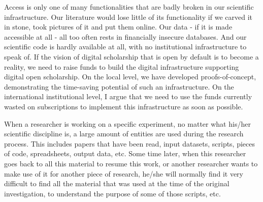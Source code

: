 \documentclass[a4paper,UKenglish]{dagrep}
\begin{document}
{}
\license
{}
Access is only one of many functionalities that are badly broken in our
scientific infrastructure. Our literature would lose little of its functionality
if we carved it in stone, took pictures of it and put them online. Our data - if
it is made accessible at all - all too often rests in financially insecure
databases. And our scientific code is hardly available at all, with no
institutional infrastructure to speak of. If the vision of digital scholarship
that is open by default is to become a reality, we need to raise funds to build
the digital infrastructure supporting digital open scholarship. On the local
level, we have developed proofs-of-concept, demonstrating the time-saving
potential of such an infrastructure. On the international institutional level, I
argue that we need to use the funds currently wasted on subscriptions to
implement this infrastructure as soon as possible.

  




{}
\license
When a researcher is working on a specific experiment, no matter what his/her scientific 
discipline is, a large amount of entities are used during the research process. This includes 
papers that have been read, input datasets, scripts, pieces of code, spreadsheets, output data, 
etc. Some time later, when this researcher goes back to all this material to resume this work, 
or another researcher wants to make use of it for another piece of research, he/she will 
normally find it very difficult to find all the material that was used at the time of the original 
investigation, to understand the purpose of some of those scripts, etc.
\end{document}
